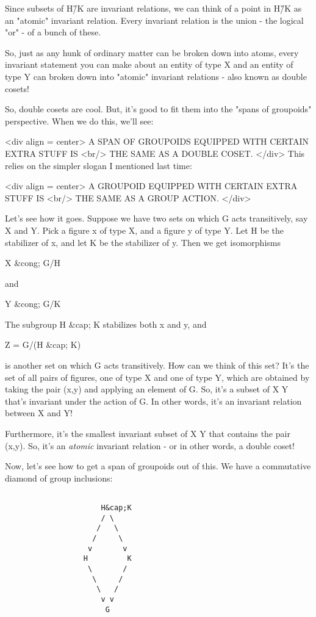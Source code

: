 Since subsets of H\G/K are invariant relations, we can think of a 
point in H\G/K as an "atomic" invariant relation.   Every invariant 
relation is the union - the logical "or" - of a bunch of these. 

So, just as any hunk of ordinary matter can be broken down into atoms,
every invariant statement you can make about an entity of type X and
an entity of type Y can broken down into "atomic" invariant
relations - also known as double cosets!

So, double cosets are cool.  But, it's good to fit them into the "spans
of groupoids" perspective.  When we do this, we'll see:

<div align = center>
          A SPAN OF GROUPOIDS EQUIPPED WITH CERTAIN EXTRA STUFF IS <br/>
                       THE SAME AS A DOUBLE COSET.
</div>
This relies on the simpler slogan I mentioned last time:

<div align = center>
             A GROUPOID EQUIPPED WITH CERTAIN EXTRA STUFF IS <br/>
                     THE SAME AS A GROUP ACTION.
</div>

Let's see how it goes.  Suppose we have two sets on which G acts
transitively, say X and Y.  Pick a figure x of type X, and a figure
y of type Y.  Let H be the stabilizer of x, and let K be the
stabilizer of y.  Then we get isomorphisms

X &cong; G/H 

and 

Y &cong; G/K

The subgroup H &cap; K stabilizes both x and y, and

Z = G/(H &cap; K)

is another set on which G acts transitively.  How can we think of this 
set?  It's the set of all pairs of figures, one of type X and one of 
type Y, which are obtained by taking the pair (x,y) and applying
an element of G.  So, it's a subset of X \times  Y that's invariant under
the action of G.  In other words, it's an invariant relation between
X and Y!  

Furthermore, it's the smallest invariant subset of X \times  Y that contains
the pair (x,y).  So, it's an \emph{atomic} invariant relation - or in other
words, a double coset!  
  
Now, let's see how to get a span of groupoids out of this.  We have
a commutative diamond of group inclusions:


\begin{verbatim}

                      H&cap;K
                      / \
                     /   \
                    /     \
                   v       v
                  H         K
                   \       /
                    \     /
                     \   /
                      v v
                       G
\end{verbatim}
    
